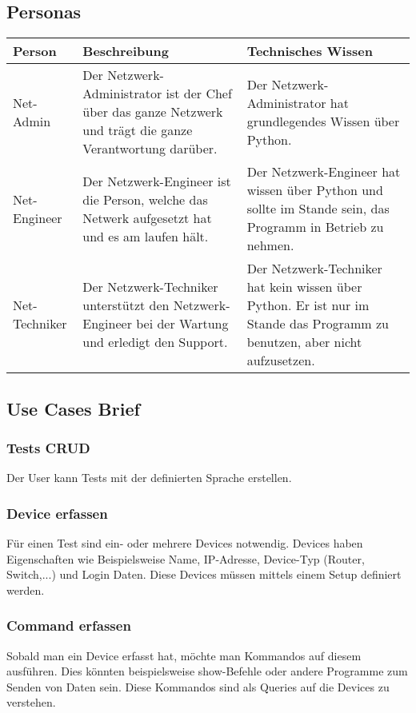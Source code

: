 \documentclass[
	ngerman,
	toc=listof, %
	toc=bibliography, %
	footnotes=multiple, %
	parskip=half, %
	numbers=noendperiod %
]{scrartcl}
\begin{document}
	\subsection{Personas}
		\begin{tabularx}{\textwidth}{lXX}
			\toprule
			Person & Beschreibung & Technisches Wissen \\
			\midrule
			Net-Admin & Der Netzwerk-Administrator ist der Chef über das ganze Netzwerk und trägt die ganze Verantwortung darüber. & Der Netzwerk-Administrator hat grundlegendes Wissen über Python.\\
			\midrule
			Net-Engineer & Der Netzwerk-Engineer ist die Person, welche das Netwerk aufgesetzt hat und es am laufen hält. & Der Netzwerk-Engineer hat wissen über Python und sollte im Stande sein, das Programm in Betrieb zu nehmen. \\
			\midrule
			Net-Techniker & Der Netzwerk-Techniker unterstützt den Netzwerk-Engineer bei der Wartung und erledigt den Support. & Der Netzwerk-Techniker hat kein wissen über Python. Er ist nur im Stande das Programm zu benutzen, aber nicht aufzusetzen. \\
			\bottomrule
		\end{tabularx}

	\subsection{Use Cases Brief}
		\subsubsection{Tests CRUD}
			Der User kann Tests mit der definierten Sprache erstellen.

		\subsubsection{Device erfassen}
			Für einen Test sind ein- oder mehrere Devices notwendig. Devices haben Eigenschaften
			wie Beispielsweise Name, IP-Adresse, Device-Typ (Router, Switch,...) und Login Daten.
			Diese Devices müssen mittels einem Setup definiert werden.

		\subsubsection{Command erfassen}
			Sobald man ein Device erfasst hat, möchte man Kommandos auf diesem ausführen.
			Dies könnten beispielsweise show-Befehle oder andere Programme zum Senden von
			Daten sein. Diese Kommandos sind als Queries auf die Devices zu verstehen.
\end{document}
